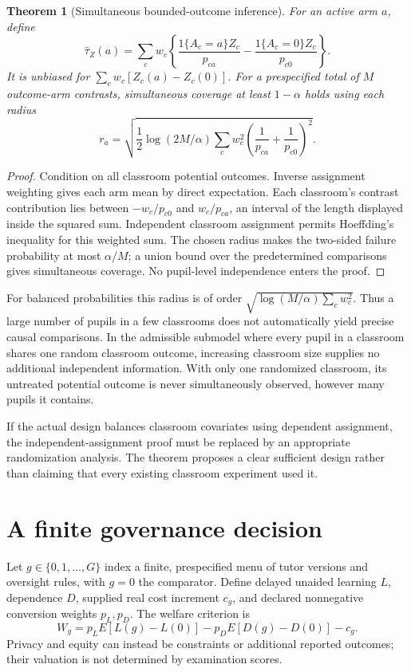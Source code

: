 \documentclass[11pt]{article}
\newtheorem{theorem}{Theorem}
\theoremstyle{remark}
\begin{document}
\begin{theorem}[Simultaneous bounded-outcome inference]
For an active arm $a$, define
\[
 \widehat\tau_Z(a)=\sum_cw_c\left\{
 \frac{1\{A_c=a\}Z_c}{p_{ca}}-
 \frac{1\{A_c=0\}Z_c}{p_{c0}}\right\}.
\]
It is unbiased for $\sum_cw_c[Z_c(a)-Z_c(0)]$. For a prespecified total of $M$ outcome-arm contrasts, simultaneous coverage at least $1-\alpha$ holds using each radius
\[
 r_a=\sqrt{\frac12\log(2M/\alpha)
       \sum_cw_c^2\left(\frac1{p_{ca}}+\frac1{p_{c0}}\right)^2}.
\]
\end{theorem}
\begin{proof}
Condition on all classroom potential outcomes. Inverse assignment weighting gives each arm mean by direct expectation. Each classroom's contrast contribution lies between $-w_c/p_{c0}$ and $w_c/p_{ca}$, an interval of the length displayed inside the squared sum. Independent classroom assignment permits Hoeffding's inequality for this weighted sum. The chosen radius makes the two-sided failure probability at most $\alpha/M$; a union bound over the predetermined comparisons gives simultaneous coverage. No pupil-level independence enters the proof.
\end{proof}
For balanced probabilities this radius is of order $\sqrt{\log(M/\alpha)\sum_cw_c^2}$. Thus a large number of pupils in a few classrooms does not automatically yield precise causal comparisons. In the admissible submodel where every pupil in a classroom shares one random classroom outcome, increasing classroom size supplies no additional independent information. With only one randomized classroom, its untreated potential outcome is never simultaneously observed, however many pupils it contains.

If the actual design balances classroom covariates using dependent assignment, the independent-assignment proof must be replaced by an appropriate randomization analysis. The theorem proposes a clear sufficient design rather than claiming that every existing classroom experiment used it.

\section*{A finite governance decision}
Let $g\in\{0,1,\ldots,G\}$ index a finite, prespecified menu of tutor versions and oversight rules, with $g=0$ the comparator. Define delayed unaided learning $L$, dependence $D$, supplied real cost increment $c_g$, and declared nonnegative conversion weights $p_L,p_D$. The welfare criterion is
\[
 W_g=p_LE[L(g)-L(0)]-p_DE[D(g)-D(0)]-c_g.
\]
Privacy and equity can instead be constraints or additional reported outcomes; their valuation is not determined by examination scores.
\end{document}
